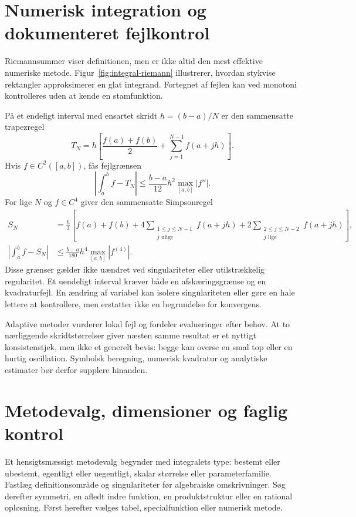 \section{Numerisk integration og dokumenteret fejlkontrol}
\label{sec:integral-numerisk}
Riemannsummer viser definitionen, men er ikke altid den mest effektive
numeriske metode. Figur~\ref{fig:integral-riemann} illustrerer, hvordan
stykvise rektangler approksimerer en glat integrand. Fortegnet af fejlen
kan ved monotoni kontrolleres uden at kende en stamfunktion.



På et endeligt interval med ensartet skridt $h=(b-a)/N$ er den sammensatte
trapezregel
\[
 T_N=h\left[\frac{f(a)+f(b)}2+\sum_{j=1}^{N-1}f(a+jh)\right].
\]
Hvis $f\in C^2([a,b])$, fås fejlgrænsen
\[
 \left|\int_a^b f-T_N\right|
 \le\frac{b-a}{12}h^2\max_{[a,b]}|f''|.
\]
For lige $N$ og $f\in C^4$ giver den sammensatte Simpsonregel
\begin{align*}
 S_N&=\frac h3\left[f(a)+f(b)
       +4\sum_{\substack{1\le j\le N-1\\j\text{ ulige}}}f(a+jh)
       +2\sum_{\substack{2\le j\le N-2\\j\text{ lige}}}f(a+jh)\right],\\
 \left|\int_a^b f-S_N\right|
 &\le\frac{b-a}{180}h^4\max_{[a,b]}|f^{(4)}|.
\end{align*}
Disse grænser gælder ikke uændret ved singulariteter eller utilstrækkelig
regularitet. Et uendeligt interval kræver både en afskæringsgrænse og en
kvadraturfejl. En ændring af variabel kan isolere singulariteten eller
gøre en hale lettere at kontrollere, men erstatter ikke en begrundelse
for konvergens.

Adaptive metoder vurderer lokal fejl og fordeler evalueringer efter behov.
At to nærliggende skridtstørrelser giver næsten samme resultat er et
nyttigt konsistenstjek, men ikke et generelt bevis: begge kan overse en
smal top eller en hurtig oscillation. Symbolsk beregning, numerisk
kvadratur og analytiske estimater bør derfor supplere hinanden.

\section{Metodevalg, dimensioner og faglig kontrol}
Et hensigtsmæssigt metodevalg begynder med integralets type: bestemt eller
ubestemt, egentligt eller uegentligt, skalar størrelse eller parameterfamilie.
Fastlæg definitionsområde og singulariteter før algebraiske omskrivninger.
Søg derefter symmetri, en afledt indre funktion, en produktstruktur eller
en rational opløsning. Først herefter vælges tabel, specialfunktion eller
numerisk metode.

